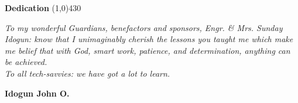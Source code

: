 \clearpage
\begin{center}
{\huge \bf Dedication}
\line(1,0){430}
\end{center}

\textit{To my wonderful Guardians, benefactors and sponsors, Engr. \& Mrs. Sunday Idogun: know that I unimaginably cherish the lessons you taught me which make me belief that with God, smart work, patience, and determination, anything can be achieved.}\\

\textit{To all tech-savvies: we have got a lot to learn.}
\begin{flushright}
	{\bf Idogun John O.}
\end{flushright}
  
\clearpage